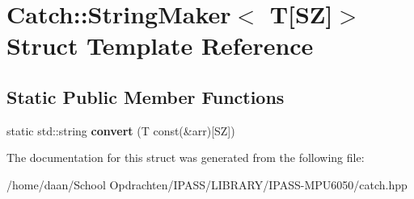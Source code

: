 \hypertarget{structCatch_1_1StringMaker_3_01T[SZ]_4}{}\section{Catch\+:\+:String\+Maker$<$ T\mbox{[}SZ\mbox{]}$>$ Struct Template Reference}
\label{structCatch_1_1StringMaker_3_01T[SZ]_4}
\subsection*{Static Public Member Functions}
\begin{DoxyCompactItemize}
\item 
\mbox{\label{structCatch_1_1StringMaker_3_01T[SZ]_4_a3698cea2c24d8649ec9ecb5fa679eeb7}} 
static std\+::string {\bfseries convert} (T const(\&arr)\mbox{[}SZ\mbox{]})
\end{DoxyCompactItemize}


The documentation for this struct was generated from the following file\+:\begin{DoxyCompactItemize}
\item 
/home/daan/\+School Opdrachten/\+I\+P\+A\+S\+S/\+L\+I\+B\+R\+A\+R\+Y/\+I\+P\+A\+S\+S-\/\+M\+P\+U6050/catch.\+hpp\end{DoxyCompactItemize}
